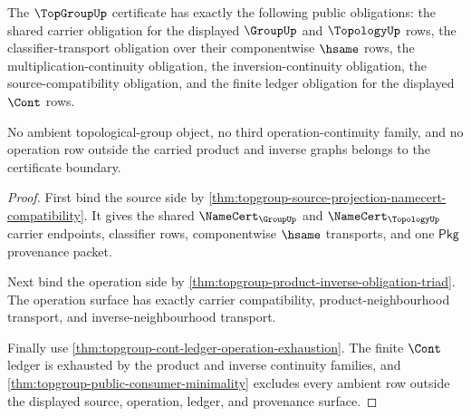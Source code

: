 \begin{theorem}
\label{thm:topgroup-obligation-inventory}
The $\TopGroupUp$ certificate has exactly the following public obligations:
the shared carrier obligation for the displayed $\GroupUp$ and $\TopologyUp$
rows, the classifier-transport obligation over their componentwise $\hsame$
rows, the multiplication-continuity obligation, the inversion-continuity
obligation, the source-compatibility obligation, and the finite ledger
obligation for the displayed $\Cont$ rows.

No ambient topological-group object, no third operation-continuity family, and
no operation row outside the carried product and inverse graphs belongs to the
certificate boundary.
\end{theorem}
\begin{proof}
First bind the source side by
\autoref{thm:topgroup-source-projection-namecert-compatibility}. It gives the
shared $\NameCert_{\GroupUp}$ and $\NameCert_{\TopologyUp}$ carrier endpoints,
classifier rows, componentwise $\hsame$ transports, and one $\mathsf{Pkg}$
provenance packet.

Next bind the operation side by
\autoref{thm:topgroup-product-inverse-obligation-triad}. The operation surface
has exactly carrier compatibility, product-neighbourhood transport, and
inverse-neighbourhood transport.

Finally use \autoref{thm:topgroup-cont-ledger-operation-exhaustion}. The finite
$\Cont$ ledger is exhausted by the product and inverse continuity families, and
\autoref{thm:topgroup-public-consumer-minimality} excludes every ambient row
outside the displayed source, operation, ledger, and provenance surface.
\end{proof}

